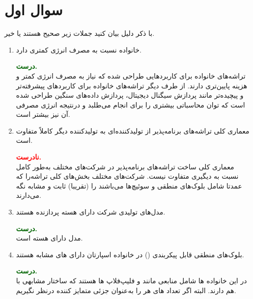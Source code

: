 \section{سوال اول}

با ذکر دلیل بیان کنید جملات زیر صحیح هستند یا خیر.

\begin{enumerate}
	\item 
	خانواده  نسبت به  مصرف انرژی کمتری دارد.
	\begin{qsolve}
		\textbf{\textcolor{darkgreen}{درست.}}\\
		تراشه‌های خانواده  برای کاربردهایی طراحی شده که نیاز به مصرف انرژی کمتر و هزینه پایین‌تری دارند. از طرف دیگر تراشه‌های خانواده  برای کاربردهای پیشرفته‌تر و پیچیده‌تر مانند پردازش سیگنال دیجیتال، پردازش داده‌های سنگین طراحی شده است که توان محاسباتی بیشتری را برای انجام می‌طلبد و درنتیجه انرژی مصرفی آن نیز بیشتر است.
	\end{qsolve}
	
	
	
	\item 
	معماری کلی تراشه‌های برنامه‌پذیر از تولیدکننده‌ای به تولیدکننده دیگر کاملاً متفاوت است.
	\begin{qsolve}
		\textbf{\textcolor{red}{نادرست.}}\\
		معماری کلی ساخت تراشه‌های برنامه‌پذیر در شرکت‌های مختلف به‌طور کامل نسبت به دیگیری متفاوت نیست. شرکت‌های مختلف بخش‌های کلی تراشه‌را که عمدتا شامل بلوک‌های منطقی و سوئیچ‌ها می‌باشند را (تقریبا) ثابت و مشابه نگه ‌می‌دارند.
	\end{qsolve}
	
	
	
	\item 
	مدل‌های  تولیدی شرکت  دارای هسته پردازنده  هستند.
	\begin{qsolve}
		\textbf{\textcolor{darkgreen}{درست.}}\\
		مدل  دارای هسته  است.
	\end{qsolve}
	
	
	
	\item 
	بلوک‌های منطقی قابل پیکربندی () در خانواده اسپارتان دارای های مشابه هستند.
	\begin{qsolve}
		\textbf{\textcolor{darkgreen}{درست.}}\\
		در این خانواده ها شامل منابعی مانند  و فلیپ‌فلاپ ها هستند که ساختار مشابهی با هم دارند. البته اگر تعداد  های هر  را به‌عنوان جزئی متمایز کننده درنظر نگیریم.
	\end{qsolve}
	

\end{enumerate}
